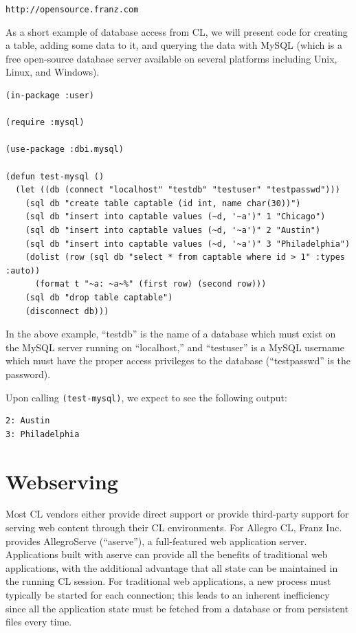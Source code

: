 \begin{center}
\texttt{http://opensource.franz.com}
\end{center}

As a short example of database access from CL, we will present code for creating a table,
adding some data to it, and querying the data with MySQL (which is a free open-source
database server available on several platforms including Unix, Linux, and Windows).

\begin{verbatim}
(in-package :user)

(require :mysql)

(use-package :dbi.mysql)

(defun test-mysql ()
  (let ((db (connect "localhost" "testdb" "testuser" "testpasswd")))
    (sql db "create table captable (id int, name char(30))")
    (sql db "insert into captable values (~d, '~a')" 1 "Chicago")
    (sql db "insert into captable values (~d, '~a')" 2 "Austin")
    (sql db "insert into captable values (~d, '~a')" 3 "Philadelphia")
    (dolist (row (sql db "select * from captable where id > 1" :types :auto))
      (format t "~a: ~a~%" (first row) (second row)))
    (sql db "drop table captable")
    (disconnect db)))
\end{verbatim}

In the above example, ``testdb'' is the name of a database which must exist on the MySQL
server running on ``localhost,'' and ``testuser'' is a MySQL username which must have the
proper access privileges to the database (``testpasswd'' is the password).

Upon calling \texttt{(test-mysql)}, we expect to see the following output:

\begin{verbatim}
2: Austin
3: Philadelphia
\end{verbatim}

\section{Webserving}

Most CL vendors either provide direct support or provide third-party support for serving web
content through their CL environments. For Allegro CL, Franz Inc. provides AllegroServe
(``aserve''), a full-featured web application server. Applications built with aserve can provide
all the benefits of traditional web applications, with the additional advantage that all state
can be maintained in the running CL session. For traditional web applications, a new process
must typically be started for each connection; this leads to an inherent inefficiency since all
the application state must be fetched from a database or from persistent files every time.


